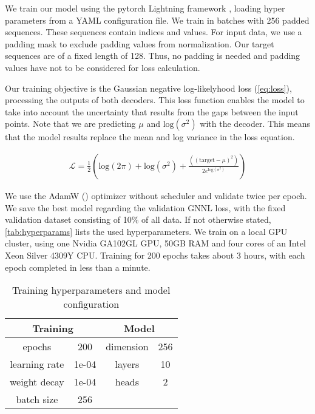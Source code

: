 We train our model using the pytorch Lightning framework \cite{falcon2019pytorch}, loading hyper parameters from a YAML configuration file. We train in batches with 256 padded sequences. These sequences contain indices and values. For input data, we use a padding mask to exclude padding values from normalization. Our target sequences are of a fixed length of 128. Thus, no padding is needed and padding values have not to be considered for loss calculation.

Our training objective is the Gaussian negative log-likelyhood loss (\autoref{eq:loss}), processing the outputs of both decoders. This loss function enables the model to take into account the uncertainty that results from the gaps between the input points. Note that we are predicting $\mu$ and $\text{log} (\sigma^2)$ with the decoder. This means that the model results replace the mean and log variance in the loss equation.

\begin{align}
\mathcal{L} = \frac{1}{2}\left(\text{log}(2\pi) + \text{log}(\sigma^2) + \frac{((\text{target} - \mu)^2)}{2 e^{\text{log}(\sigma^2)}}\right) \label{eq:loss}
\end{align}

We use the AdamW (\citet{loshchilov2017fixing}) optimizer without scheduler and validate twice per epoch. We save the best model regarding the validation GNNL loss, with the fixed validation dataset consisting of 10\% of all data. If not otherwise stated, \autoref{tab:hyperparams} lists the used hyperparameters. We train on a local GPU cluster, using one Nvidia GA102GL GPU, 50GB RAM and four cores of an Intel Xeon Silver 4309Y CPU. Training for 200 epochs takes about 3 hours, with each epoch completed in less than a minute.

\begin{table}[]
	\centering
	\caption{Training hyperparameters and model configuration}
	\begin{tabular}{c c c c}
		\toprule
		\multicolumn{2}{c}{Training} & \multicolumn{2}{c}{Model} \\
		\midrule
		epochs & 200 & dimension & 256 \\
		learning rate & 1e-04 & layers & 10\\
		weight decay & 1e-04 & heads & 2  \\
		batch size & 256 & \\\bottomrule
	\end{tabular}
	\label{tab:hyperparams}
\end{table}

